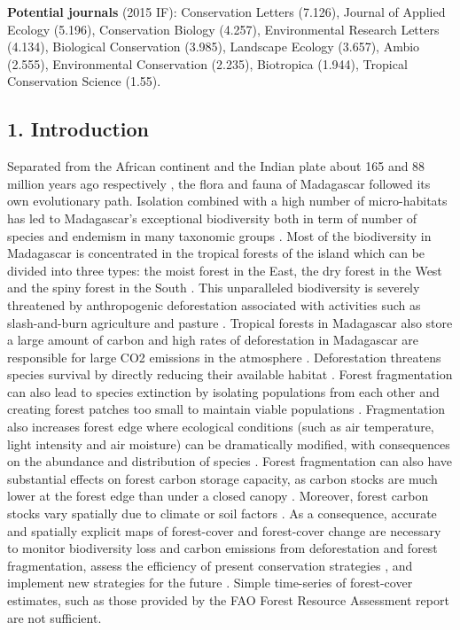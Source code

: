 \documentclass[]{article}
\begin{document}
\textbf{Potential journals} (2015 IF): Conservation Letters (7.126),
Journal of Applied Ecology (5.196), Conservation Biology (4.257),
Environmental Research Letters (4.134), Biological Conservation (3.985),
Landscape Ecology (3.657), Ambio (2.555), Environmental Conservation
(2.235), Biotropica (1.944), Tropical Conservation Science (1.55).

\hypertarget{introduction}{%
\subsection{1. Introduction}\label{introduction}}

Separated from the African continent and the Indian plate about 165 and
88 million years ago respectively \citep{Ali2008}, the flora and fauna
of Madagascar followed its own evolutionary path. Isolation combined
with a high number of micro-habitats \citep{Pearson2009} has led to
Madagascar's exceptional biodiversity both in term of number of species
and endemism in many taxonomic groups \citep{Crottini2012, Goodman2005}.
Most of the biodiversity in Madagascar is concentrated in the tropical
forests of the island which can be divided into three types: the moist
forest in the East, the dry forest in the West and the spiny forest in
the South \citep{Vieilledent2016}. This unparalleled biodiversity is
severely threatened by anthropogenic deforestation
\citep{Harper2007, Vieilledent2013} associated with activities such as
slash-and-burn agriculture and pasture \citep{Scales2011}. Tropical
forests in Madagascar also store a large amount of carbon
\citep{Vieilledent2016} and high rates of deforestation in Madagascar
are responsible for large CO2 emissions in the atmosphere
\citep{Achard2014}. Deforestation threatens species survival by directly
reducing their available habitat \citep{Brooks2002, Tidd2001}. Forest
fragmentation can also lead to species extinction by isolating
populations from each other and creating forest patches too small to
maintain viable populations \citep{Saunders1991}. Fragmentation also
increases forest edge where ecological conditions (such as air
temperature, light intensity and air moisture) can be dramatically
modified, with consequences on the abundance and distribution of species
\citep{Murcia1995}. Forest fragmentation can also have substantial
effects on forest carbon storage capacity, as carbon stocks are much
lower at the forest edge than under a closed canopy \citep{Brinck2017}.
Moreover, forest carbon stocks vary spatially due to climate or soil
factors \citep{Saatchi2011, Vieilledent2016}. As a consequence, accurate
and spatially explicit maps of forest-cover and forest-cover change are
necessary to monitor biodiversity loss and carbon emissions from
deforestation and forest fragmentation, assess the efficiency of present
conservation strategies \citep{Eklund2016}, and implement new strategies
for the future \citep{Vieilledent2013, Vieilledent2016}. Simple
time-series of forest-cover estimates, such as those provided by the FAO
Forest Resource Assessment report \citep{Keenan2015} are not sufficient.
\end{document}
